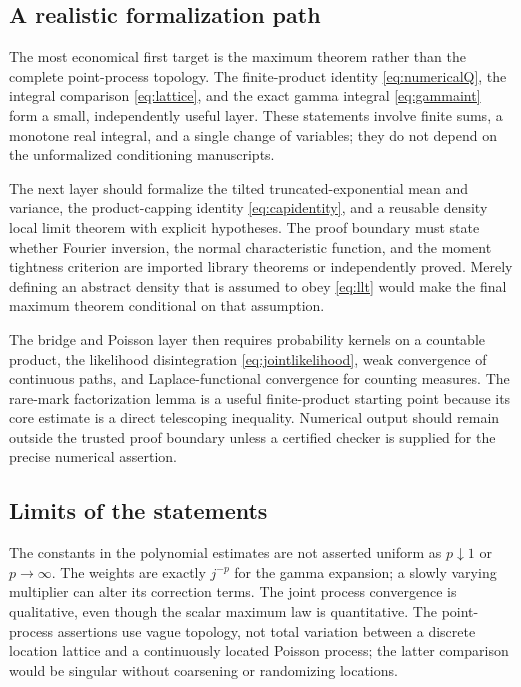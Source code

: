 \documentclass[11pt,a4paper]{article}
\numberwithin{equation}{section}
\theoremstyle{definition}
\theoremstyle{remark}
\begin{document}
\subsection{A realistic formalization path}
The most economical first target is the maximum theorem rather than
the complete point-process topology. The finite-product identity
\eqref{eq:numericalQ}, the integral comparison
\eqref{eq:lattice}, and the exact gamma integral
\eqref{eq:gammaint} form a small, independently useful layer. These
statements involve finite sums, a monotone real integral, and a
single change of variables; they do not depend on the unformalized
conditioning manuscripts.

The next layer should formalize the tilted truncated-exponential mean
and variance, the product-capping identity \eqref{eq:capidentity},
and a reusable density local limit theorem with explicit hypotheses.
The proof boundary must state whether Fourier inversion, the normal
characteristic function, and the moment tightness criterion are imported
library theorems or independently proved. Merely defining an abstract
density that is assumed to obey \eqref{eq:llt} would make the final
maximum theorem conditional on that assumption.

The bridge and Poisson layer then requires probability kernels on a
countable product, the likelihood disintegration
\eqref{eq:jointlikelihood}, weak convergence of continuous paths,
and Laplace-functional convergence for counting measures. The rare-mark
factorization lemma is a useful finite-product starting point because
its core estimate is a direct telescoping inequality. Numerical output
should remain outside the trusted proof boundary unless a certified
checker is supplied for the precise numerical assertion.

\subsection{Limits of the statements}
The constants in the polynomial estimates are not asserted uniform as
$p\downarrow1$ or $p\to\infty$. The weights are exactly $j^{-p}$
for the gamma expansion; a slowly varying multiplier can alter its
correction terms. The joint process convergence is qualitative, even
though the scalar maximum law is quantitative. The point-process
assertions use vague topology, not total variation between a discrete
location lattice and a continuously located Poisson process; the latter
comparison would be singular without coarsening or randomizing locations.
\end{document}
